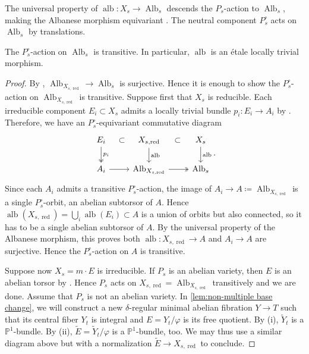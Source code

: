 \documentclass[reqno, letterpaper]{amsart}
\numberwithin{equation}{subsection}
\let\to\longrightarrow
\newcommand{\PP}{\mathbb{P}}
\DeclareMathOperator{\red}{red}
\DeclareMathOperator{\Alb}{Alb}
\DeclareMathOperator{\alb}{alb}
\begin{document}
		The universal property of $\alb : X_s \to \Alb_s$ descends the $P_s$-action to $\Alb_s$, making the Albanese morphism equivariant \cite[Corollary~10.3]{lau-sch24}. The neutral component $P^\circ_s$ acts on $\Alb_s$ by translations.
		
		\begin{lemma} \label{lem:transitive action on Albanese}
			The $P^\circ_s$-action on $\Alb_s$ is transitive. In particular, $\alb$ is an \'etale locally trivial morphism.
		\end{lemma}
		\begin{proof}
			By , $\Alb_{X_{s, \red}} \to \Alb_s$ is surjective. Hence it is enough to show the $P^\circ_s$-action on $\Alb_{X_{s, \red}}$ is transitive. Suppose first that $X_s$ is reducible. Each irreducible component $E_i \subset X_s$ admits a locally trivial bundle $p_i : E_i \to A_i$ by . Therefore, we have an $P^\circ_s$-equivariant commutative diagram
			\[\begin{tikzcd}
				E_i \arrow[r, phantom, "\subset"] \arrow[d, twoheadrightarrow, "p_i"] & X_{s, \red} \arrow[r, phantom, "\subset"] \arrow[d, "\alb"] &  X_s \arrow[d, "\alb"] \\
				A_i \arrow[r] & \Alb_{X_{s, \red}} \arrow[r, twoheadrightarrow] & \Alb_s
			\end{tikzcd}.\]
			Since each $A_i$ admits a transitive $P^\circ_s$-action, the image of $A_i \to A \coloneq \Alb_{X_{s, \red}}$ is a single $P^\circ_s$-orbit, an abelian subtorsor of $A$. Hence $\alb(X_{s, \red}) = \bigcup_i \alb(E_i) \subset A$ is a union of orbits but also connected, so it has to be a single abelian subtorsor of $A$. By the universal property of the Albanese morphism, this proves both $\alb : X_{s, \red} \to A$ and $A_i \to A$ are surjective. Hence the $P_s^\circ$-action on $A$ is transitive.
			
			Suppose now $X_s = m \cdot E$ is irreducible. If $P_s$ is an abelian variety, then $E$ is an abelian torsor by . Hence $P_s$ acts on $X_{s, \red} = \Alb_{X_{s, \red}}$ transitively and we are done. Assume that $P_s$ is not an abelian variety. In \eqref{lem:non-multiple base change}, we will construct a new $\delta$-regular minimal abelian fibration $Y \to T$ such that its central fiber $Y_t$ is integral and $E = Y_t / \varphi$ is its free quotient. By (i), $\tilde Y_t$ is a $\PP^1$-bundle. By (ii), $\tilde E = \tilde Y_t / \varphi$ is a $\PP^1$-bundle, too. We may thus use a similar diagram above but with a normalization $\tilde E \to X_{s, \red}$ to conclude.
		\end{proof}
		
\end{document}
